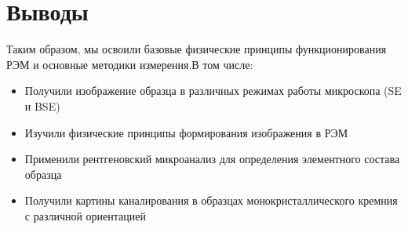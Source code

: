 \documentclass[a4paper,12pt]{article}
\begin{document}
\section{Выводы}
Таким образом, мы освоили базовые физические принципы функционирования РЭМ и основные методики измерения.В том числе:

\begin{itemize}
    \item Получили изображение образца в различных режимах работы микроскопа (SE и BSE)
    \item Изучили физические принципы формирования изображения в РЭМ
    \item Применили рентгеновский микроанализ для определения элементного состава образца
    \item Получили картины каналирования в образцах монокристаллического кремния с различной ориентацией
\end{itemize}
\end{document}
